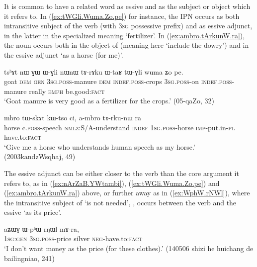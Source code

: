 It is common to have a related word as essive and as the subject or object which it refers to. In (\ref{ex:tWGli.Wuma.Zo.pe}) for instance, the IPN  occurs as both intransitive subject of the verb  (with \textsc{3sg} possessive prefix) and as essive adjunct, in the latter in the specialized meaning `fertilizer'. In (\ref{ex:ambro.tArkunW.ra}), the noun  occurs both in the object of  (meaning here `include the dowry') and in the essive adjunct   `as a horse (for me)'.

\begin{exe}
\ex \label{ex:tWGli.Wuma.Zo.pe}
\gll tsʰɤt nɯ ɣɯ ɯ-ɣli nɯnɯ tɤ-rɤku ɯ-taʁ tɯ-ɣli wuma ʑo pe. \\
goat \textsc{dem} \textsc{gen} \textsc{3sg}.\textsc{poss}-manure \textsc{dem} \textsc{indef}.\textsc{poss}-crops \textsc{3sg}.\textsc{poss}-on \textsc{indef}.\textsc{poss}-manure really \textsc{emph} be.good:\textsc{fact} \\
\glt `Goat manure is very good as a fertilizer for the crops.' (05-qaZo, 32)
\end{exe}

\begin{exe}
\ex \label{ex:ambro.tArkunW.ra}
\gll mbro tɯ-skɤt kɯ-tso ci, a-mbro tɤ-rku-nɯ ra \\
horse c.\textsc{poss}-speech \textsc{nmlz}:S/A-understand \textsc{indef} \textsc{1sg}.\textsc{poss}-horse \textsc{imp}-put.in-\textsc{pl} have.to:\textsc{fact} \\
\glt `Give me a horse who understands human speech as my horse.'  (2003kandzWsqhaj, 49)
\end{exe}

The essive adjunct can be either closer to the verb than the core argument it refers to, as in (\ref{ex:nArZaB.YWtambi}), (\ref{ex:tWGli.Wuma.Zo.pe}) and (\ref{ex:ambro.tArkunW.ra}) above, or further away as in (\ref{ex:WphW.rNWl}), where the intransitive  subject of  `is not needed', , occurs between the verb and the essive  `as its price'.

\begin{exe}
\ex \label{ex:WphW.rNWl}
\gll  aʑɯɣ ɯ-pʰɯ rŋɯl mɤ-ra, \\
\textsc{1sg}:\textsc{gen} \textsc{3sg}.\textsc{poss}-price silver \textsc{neg}-have.to:\textsc{fact} \\
\glt `I don't want money as the price (for these clothes).' (140506 shizi he huichang de bailingniao, 241)
\end{exe}

